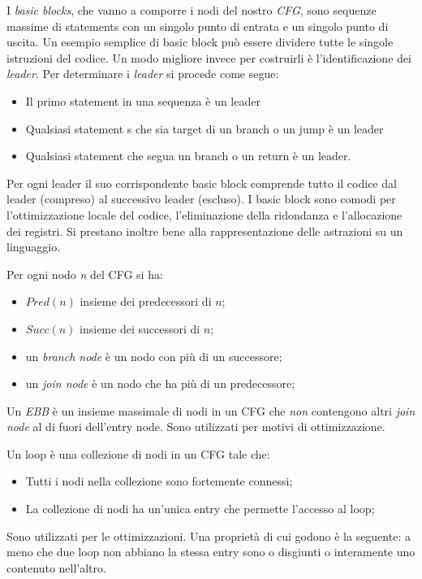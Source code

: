 \documentclass[a4paper,12pt,openany]{article}
\newenvironment{definition}[1][Definizione]{\begin{trivlist}
\item[\hskip \labelsep {\bfseries #1}]}{\end{trivlist}}
\begin{document}
\begin{definition}[Basic block]
    I \emph{basic blocks}, che vanno a comporre i nodi del nostro \emph{CFG}, sono sequenze massime di 
    statements con un singolo punto di entrata e un singolo punto di uscita. Un esempio semplice di basic 
    block può essere dividere tutte le singole istruzioni del codice. Un modo migliore invece per costruirli è
    l'identificazione dei \emph{leader}. Per determinare i \emph{leader}  si procede come segue:
    \begin{itemize}
        \item Il primo statement in una sequenza è un leader
        \item Qualsiasi statement s che sia target di un branch o un jump è un leader
        \item Qualsiasi statement che segua un branch o un return è un leader.
    \end{itemize}
    Per ogni leader il suo corrispondente basic block comprende tutto il codice dal leader (compreso) al 
    successivo leader (escluso).
    I basic block sono comodi per l'ottimizzazione locale del codice, l'eliminazione della ridondanza e 
    l'allocazione dei registri. Si prestano inoltre bene alla rappresentazione delle astrazioni su un
    linguaggio.
\end{definition}

Per ogni nodo \emph{n} del CFG si ha:
\begin{itemize}
    \item $Pred(n)$ insieme dei predecessori di $n$;
    \item $Succ(n)$ insieme dei successori di $n$;
    \item un \emph{branch node} è un nodo con più di un successore;
    \item un \emph{join node} è un nodo che ha più di un predecessore;
\end{itemize}

\begin{definition}[Extended Basic Block (EBB)]
    Un \emph{EBB} è un insieme massimale di nodi in un CFG che \emph{non} contengono altri \emph{join node} al
    di fuori dell'entry node. Sono utilizzati per motivi di ottimizzazione.
\end{definition}

\begin{definition}[Natural Loop]
    Un loop è una collezione di nodi in un CFG tale che:
    \begin{itemize}
        \item Tutti i nodi nella collezione sono fortemente connessi;
        \item La collezione di nodi ha un'unica entry che permette l'accesso al loop;
    \end{itemize}
    Sono utilizzati per le ottimizzazioni. Una proprietà di cui godono è la seguente: a meno che due loop non
    abbiano la stessa entry sono o disgiunti o interamente uno contenuto nell'altro.
\end{definition}
\end{document}
